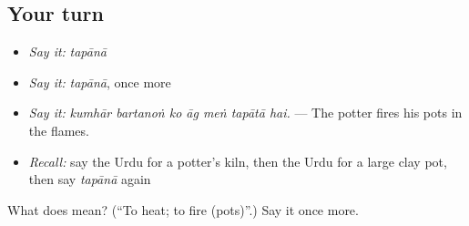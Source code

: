 \subsection*{Your turn}
\begin{itemize}
\raggedright
  \item \emph{Say it:} \emph{tapānā}
  \item \emph{Say it:} \emph{tapānā}, once more
  \item \emph{Say it:} \emph{kumhār bartanoṅ ko āg meṅ tapātā hai.} — The potter fires his pots in the flames.
  \item \emph{Recall:} say the Urdu for a potter's kiln, then the Urdu for a large clay pot, then say \emph{tapānā} again
\end{itemize}

\begin{tcolorbox}[breakable,colback=teal!4,colframe=teal!35!black,title={Before you move on}]
What does  mean? (\textquotedblleft{}To heat; to fire (pots)\textquotedblright{}.) Say it once more.
\end{tcolorbox}
